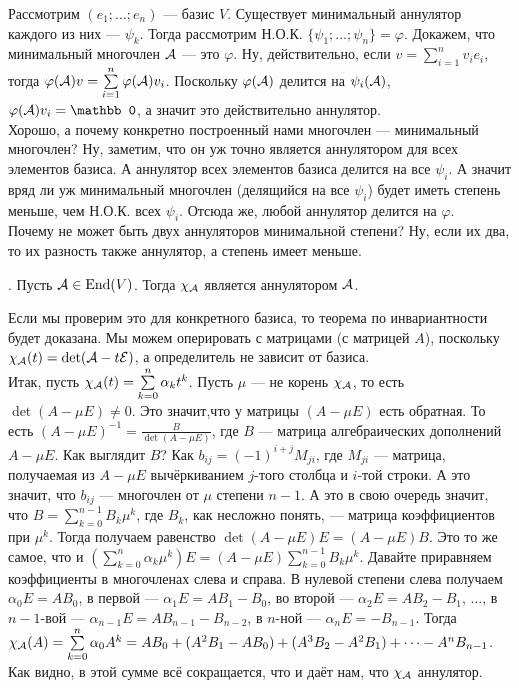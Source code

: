 \documentclass{article}
\newcommand*{\id}{{\scriptE}}
\begin{document}
\begin{itemize}
        \begin{Proof}
            Рассмотрим $(e_1;\ldots;e_n)$ --- базис $V$. Существует минимальный аннулятор каждого из них --- $\psi_k$. Тогда рассмотрим Н.О.К. $\{\psi_1;\ldots;\psi_n\}=\varphi$. Докажем, что минимальный многочлен ${\mathcal{A}}$ --- это $\varphi$. Ну, действительно, если $v=\sum\limits_{i=1}^nv_ie_i$, тогда $\varphi({\mathcal{A}})v=\sum\limits_{i=1}^n\varphi({\mathcal{A}})v_i$. Поскольку $\varphi({\mathcal{A}})$ делится на $\psi_i({\mathcal{A}})$, $\varphi(\scriptA)v_i=\mathbb0$, а значит это действительно аннулятор.\\
            Хорошо, а почему конкретно построенный нами многочлен --- минимальный многочлен? Ну, заметим, что он уж точно является аннулятором для всех элементов базиса. А аннулятор всех элементов базиса делится на все $\psi_i$. А значит вряд ли уж минимальный многочлен (делящийся на все $\psi_i$) будет иметь степень меньше, чем Н.О.К. всех $\psi_i$. Отсюда же, любой аннулятор делится на $\varphi$.\\
            Почему не может быть двух аннуляторов минимальной степени? Ну, если их два, то их разность также аннулятор, а степень имеет меньше.
        \end{Proof}
        \thm {}. Пусть ${\mathcal{A}}\in\operatorname{End}(V)$. Тогда $\chi_{\mathcal{A}}$ является аннулятором ${\mathcal{A}}$.
        \begin{Proof}
            Если мы проверим это для конкретного базиса, то теорема по инвариантности будет доказана. Мы можем оперировать с матрицами (с матрицей $A$), поскольку $\chi_\scriptA(t)=\det(\scriptA-t\id)$, а определитель не зависит от базиса.\\
            Итак, пусть $\chi_{\mathcal{A}}(t)=\sum\limits_{k=0}^n\alpha_k t^k$. Пусть $\mu$ --- не корень $\chi_{\mathcal{A}}$, то есть $\det(A-\mu E)\neq0$. Это значит,что у матрицы $(A-\mu E)$ есть обратная. То есть $(A-\mu E)^{-1}=\frac B{\det(A-\mu E)}$, где $B$ --- матрица алгебраических дополнений $A-\mu E$. Как выглядит $B$? Как $b_{ij}=(-1)^{i+j}M_{ji}$, где $M_{ji}$ --- матрица, получаемая из $A-\mu E$ вычёркиванием $j$-того столбца и $i$-той строки. А это значит, что $b_{ij}$ --- многочлен от $\mu$ степени $n-1$. А это в свою очередь значит, что $B=\sum\limits_{k=0}^{n-1}B_k\mu^k$, где $B_k$, как несложно понять, --- матрица коэффициентов при $\mu^k$. Тогда получаем равенство $\det(A-\mu E)E=(A-\mu E)B$. Это то же самое, что и $\left(\sum\limits_{k=0}^n\alpha_k\mu^k\right)E=(A-\mu E)\sum\limits_{k=0}^{n-1}B_k\mu^k$. Давайте приравняем коэффициенты в многочленах слева и справа. В нулевой степени слева получаем $\alpha_0E=AB_0$, в первой --- $\alpha_1E=AB_1-B_0$, во второй --- $\alpha_2E=AB_2-B_1$, ..., в $n-1$-вой --- $\alpha_{n-1}E=AB_{n-1}-B_{n-2}$, в $n$-ной --- $\alpha_nE=-B_{n-1}$. Тогда $\chi_{\mathcal{A}}(A)=\sum\limits_{k=0}^n\alpha_0A^k=AB_0+(A^2B_1-AB_0)+(A^3B_2-A^2B_1)+\cdots-A^nB_{n-1}$. Как видно, в этой сумме всё сокращается, что и даёт нам, что $\chi_{\mathcal{A}}$ аннулятор.

\end{Proof}
\end{itemize}
\end{document}
